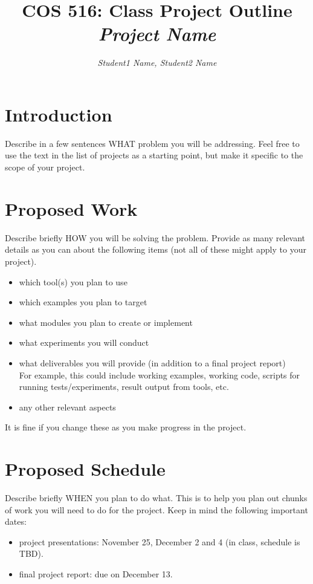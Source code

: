\documentclass[10pt]{article}
\title{COS 516: Class Project Outline\\
\emph{Project Name}}
\author{\emph{Student1 Name, Student2 Name}}
\begin{document}
\maketitle

\section{Introduction}

Describe in a few sentences WHAT problem you will be addressing. Feel free to use the text in the list of projects as a starting point, but make it specific to the scope of your project.

\section{Proposed Work}

Describe briefly HOW you will be solving the problem. Provide as many relevant details as you can about the following items (not all of these might apply to your project). 
\begin{itemize}
\item which tool(s) you plan to use
\item which examples you plan to target
\item what modules you plan to create or implement
\item what experiments you will conduct
\item what deliverables you will provide (in addition to a final project report) \\
For example, this could include working examples, working code, scripts for running tests/experiments, result output from tools, etc.
\item any other relevant aspects
\end{itemize}
It is fine if you change these as you make progress in the project. 

\section{Proposed Schedule}

Describe briefly WHEN you plan to do what. This is to help you plan out chunks of work you will need to do for the project.  
Keep in mind the following important dates:
\begin{itemize}
\item project presentations: November 25, December 2 and 4 (in class, schedule is TBD).
\item final project report: due on December 13.
\end{itemize}
\end{document}
